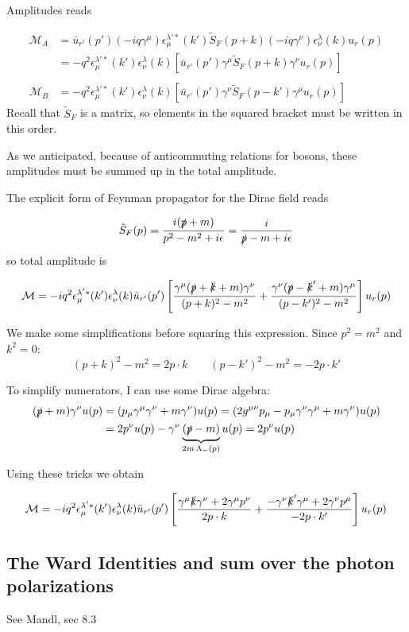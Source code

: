 \documentclass[TheoreticalPhy_ModB.tex]{subfiles}
\begin{document}
Amplitudes reads

\begin{align*}
\mathcal M_A&=\bar u_{r'}(p')(-iq\gamma^\mu)\epsilon_\mu^{\lambda'*}(k')\tilde S_F(p+k)(-iq\gamma^\nu)\epsilon_\nu^\lambda(k)u_r(p)\\
&=-q^2\epsilon_\mu^{\lambda'*}(k')\epsilon_\nu^\lambda(k)\left[\bar u_{r'}(p')\gamma^\mu\tilde S_F(p+k)\gamma^\nu u_r(p)\right]\\
&\,\\
\mathcal M_B&=-q^2\epsilon_\mu^{\lambda'*}(k')\epsilon_\nu^\lambda(k)\left[\bar u_{r'}(p')\gamma^\nu\tilde S_F(p-k')\gamma^\mu u_r(p)\right]
\end{align*}
Recall that $\tilde S_F$ is a matrix, so elements in the squared bracket  must be written in this order.

As we anticipated, because of anticommuting relations for bosons, these amplitudes must be summed up in the total amplitude.

The explicit form of Feynman propagator for the Dirac field reads

\[\tilde S_F(p)=\frac{i(\slashed p+m)}{p^2-m^2+i\epsilon}=\frac i{\slashed p-m+i\epsilon}\]
so total amplitude is

\[\mathcal M=-iq^2\epsilon_\mu^{\lambda'*}(k')\epsilon_\nu^\lambda(k)\bar u_{r'}(p')\left[\frac{\gamma^\mu(\slashed p+\slashed k+m)\gamma^\nu}{(p+k)^2-m^2}+\frac{\gamma^\nu(\slashed p-\slashed k'+m)\gamma^\mu}{(p-k')^2-m^2}\right]u_r(p)\]

We make some simplifications before squaring  this expression. Since $p^2=m^2$ and $k^2=0$:
\[(p+k)^2-m^2=2p\cdot k\qquad(p-k')^2-m^2=-2p\cdot k'\]

To simplify numerators, I can use some Dirac algebra:
\begin{align*} 
(\slashed p+m)\gamma^\nu u(p)&=(p_\mu\gamma^\mu\gamma^\nu+m\gamma^\nu)u(p)=(2g^{\mu\nu}p_\mu-p_\mu\gamma^\nu\gamma^\mu+m\gamma^\nu)u(p)\\
&=2p^\nu u(p)-\gamma^\nu\underbrace{(\slashed p-m)}_{2m\,\Lambda_-(p)}u(p)=2p^\nu u(p)
\end{align*}

Using these tricks we obtain

\[\mathcal M = -iq^2\epsilon_\mu^{\lambda'*}(k')\epsilon_\nu^\lambda(k)\bar u_{r'}(p')\left[\frac{\gamma^\mu\slashed k\gamma^\nu+2\gamma^\mu p^\nu}{2p\cdot k}+\frac{-\gamma^\nu\slashed k'\gamma^\mu+2\gamma^\nu p^\mu}{-2p\cdot k'}\right]u_r(p)\]

\subsection{The Ward Identities and sum over the photon polarizations}
\textsf{See Mandl, sec 8.3}\\
\end{document}
